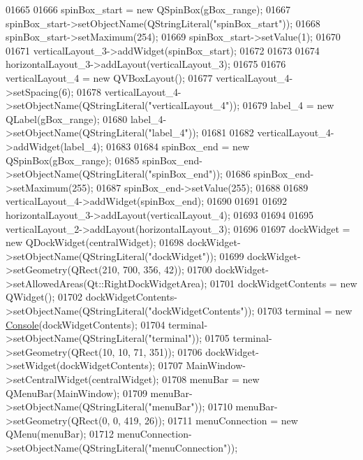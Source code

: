 \begin{DoxyCode}
01665 
01666         spinBox\_start = \textcolor{keyword}{new} QSpinBox(gBox\_range);
01667         spinBox\_start->setObjectName(QStringLiteral(\textcolor{stringliteral}{"spinBox\_start"}));
01668         spinBox\_start->setMaximum(254);
01669         spinBox\_start->setValue(1);
01670 
01671         verticalLayout\_3->addWidget(spinBox\_start);
01672 
01673 
01674         horizontalLayout\_3->addLayout(verticalLayout\_3);
01675 
01676         verticalLayout\_4 = \textcolor{keyword}{new} QVBoxLayout();
01677         verticalLayout\_4->setSpacing(6);
01678         verticalLayout\_4->setObjectName(QStringLiteral(\textcolor{stringliteral}{"verticalLayout\_4"}));
01679         label\_4 = \textcolor{keyword}{new} QLabel(gBox\_range);
01680         label\_4->setObjectName(QStringLiteral(\textcolor{stringliteral}{"label\_4"}));
01681 
01682         verticalLayout\_4->addWidget(label\_4);
01683 
01684         spinBox\_end = \textcolor{keyword}{new} QSpinBox(gBox\_range);
01685         spinBox\_end->setObjectName(QStringLiteral(\textcolor{stringliteral}{"spinBox\_end"}));
01686         spinBox\_end->setMaximum(255);
01687         spinBox\_end->setValue(255);
01688 
01689         verticalLayout\_4->addWidget(spinBox\_end);
01690 
01691 
01692         horizontalLayout\_3->addLayout(verticalLayout\_4);
01693 
01694 
01695         verticalLayout\_2->addLayout(horizontalLayout\_3);
01696 
01697         dockWidget = \textcolor{keyword}{new} QDockWidget(centralWidget);
01698         dockWidget->setObjectName(QStringLiteral(\textcolor{stringliteral}{"dockWidget"}));
01699         dockWidget->setGeometry(QRect(210, 700, 356, 42));
01700         dockWidget->setAllowedAreas(Qt::RightDockWidgetArea);
01701         dockWidgetContents = \textcolor{keyword}{new} QWidget();
01702         dockWidgetContents->setObjectName(QStringLiteral(\textcolor{stringliteral}{"dockWidgetContents"}));
01703         terminal = \textcolor{keyword}{new} \hyperlink{a00002}{Console}(dockWidgetContents);
01704         terminal->setObjectName(QStringLiteral(\textcolor{stringliteral}{"terminal"}));
01705         terminal->setGeometry(QRect(10, 10, 71, 351));
01706         dockWidget->setWidget(dockWidgetContents);
01707         MainWindow->setCentralWidget(centralWidget);
01708         menuBar = \textcolor{keyword}{new} QMenuBar(MainWindow);
01709         menuBar->setObjectName(QStringLiteral(\textcolor{stringliteral}{"menuBar"}));
01710         menuBar->setGeometry(QRect(0, 0, 419, 26));
01711         menuConnection = \textcolor{keyword}{new} QMenu(menuBar);
01712         menuConnection->setObjectName(QStringLiteral(\textcolor{stringliteral}{"menuConnection"}));

\end{DoxyCode}
